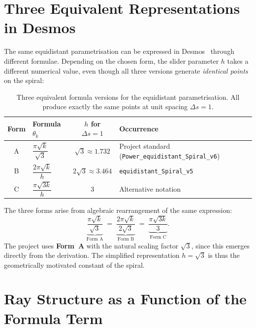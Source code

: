 \section{Three Equivalent Representations in Desmos}

The same equidistant parametrisation can be expressed in
Desmos~\cite{Desmos2024} through different formulae. Depending on the
chosen form, the slider parameter $h$ takes a different numerical value,
even though all three versions generate \emph{identical points} on the spiral:

\begin{table}[H]
\centering
\renewcommand{\arraystretch}{1.4}
\caption{Three equivalent formula versions for the equidistant parametrisation.
  All produce exactly the same points at unit spacing $\Delta s=1$.}
\begin{tabular}{clcl}
\toprule
Form & Formula $\theta_k$ & $h$ for $\Delta s=1$ & Occurrence \\
\midrule
A & $\dfrac{\pi\sqrt{k}}{\sqrt{3}}$
  & $\sqrt{3} \approx 1.732$
  & Project standard (\texttt{Power\_equidistant\_Spiral\_v6}) \\[8pt]
B & $\dfrac{2\pi\sqrt{k}}{h}$
  & $2\sqrt{3} \approx 3.464$
  & \texttt{equidistant\_Spiral\_v5} \\[8pt]
C & $\dfrac{\pi\sqrt{3k}}{h}$
  & $3$
  & Alternative notation \\
\bottomrule
\end{tabular}
\end{table}

\begin{bemerkung}
The three forms arise from algebraic rearrangement of the same expression:
\[
  \underbrace{\frac{\pi\sqrt{k}}{\sqrt{3}}}_{\text{Form A}}
  \;=\; \underbrace{\frac{2\pi\sqrt{k}}{2\sqrt{3}}}_{\text{Form B}}
  \;=\; \underbrace{\frac{\pi\sqrt{3k}}{3}}_{\text{Form C}}.
\]
The project uses \textbf{Form~A} with the natural scaling factor
$\sqrt{3}$, since this emerges directly from the derivation. The
simplified representation $h = \sqrt{3}$ is thus the geometrically
motivated constant of the spiral.
\end{bemerkung}

\section{Ray Structure as a Function of the Formula Term}

